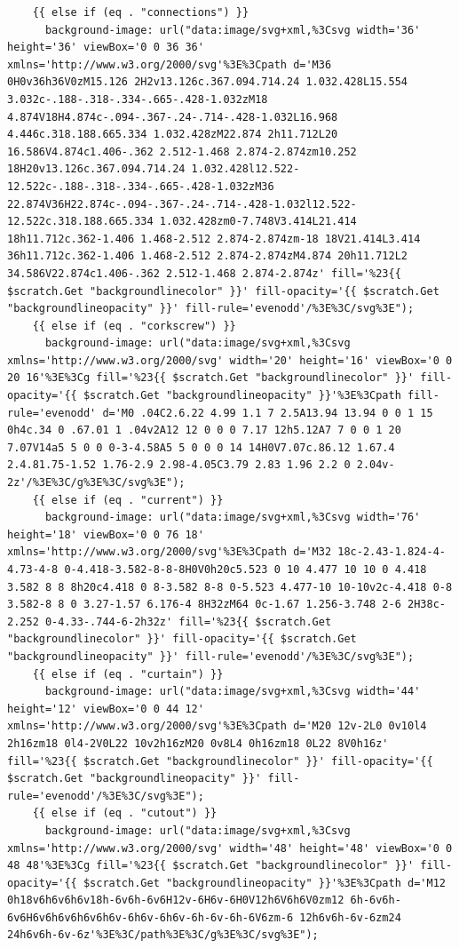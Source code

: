 \documentclass[11pt]{article}
\begin{document}
\begin{enumerate}
\begin{verbatim}
    {{ else if (eq . "connections") }}
      background-image: url("data:image/svg+xml,%3Csvg width='36' height='36' viewBox='0 0 36 36' xmlns='http://www.w3.org/2000/svg'%3E%3Cpath d='M36 0H0v36h36V0zM15.126 2H2v13.126c.367.094.714.24 1.032.428L15.554 3.032c-.188-.318-.334-.665-.428-1.032zM18 4.874V18H4.874c-.094-.367-.24-.714-.428-1.032L16.968 4.446c.318.188.665.334 1.032.428zM22.874 2h11.712L20 16.586V4.874c1.406-.362 2.512-1.468 2.874-2.874zm10.252 18H20v13.126c.367.094.714.24 1.032.428l12.522-12.522c-.188-.318-.334-.665-.428-1.032zM36 22.874V36H22.874c-.094-.367-.24-.714-.428-1.032l12.522-12.522c.318.188.665.334 1.032.428zm0-7.748V3.414L21.414 18h11.712c.362-1.406 1.468-2.512 2.874-2.874zm-18 18V21.414L3.414 36h11.712c.362-1.406 1.468-2.512 2.874-2.874zM4.874 20h11.712L2 34.586V22.874c1.406-.362 2.512-1.468 2.874-2.874z' fill='%23{{ $scratch.Get "backgroundlinecolor" }}' fill-opacity='{{ $scratch.Get "backgroundlineopacity" }}' fill-rule='evenodd'/%3E%3C/svg%3E");
    {{ else if (eq . "corkscrew") }}
      background-image: url("data:image/svg+xml,%3Csvg xmlns='http://www.w3.org/2000/svg' width='20' height='16' viewBox='0 0 20 16'%3E%3Cg fill='%23{{ $scratch.Get "backgroundlinecolor" }}' fill-opacity='{{ $scratch.Get "backgroundlineopacity" }}'%3E%3Cpath fill-rule='evenodd' d='M0 .04C2.6.22 4.99 1.1 7 2.5A13.94 13.94 0 0 1 15 0h4c.34 0 .67.01 1 .04v2A12 12 0 0 0 7.17 12h5.12A7 7 0 0 1 20 7.07V14a5 5 0 0 0-3-4.58A5 5 0 0 0 14 14H0V7.07c.86.12 1.67.4 2.4.81.75-1.52 1.76-2.9 2.98-4.05C3.79 2.83 1.96 2.2 0 2.04v-2z'/%3E%3C/g%3E%3C/svg%3E");
    {{ else if (eq . "current") }}
      background-image: url("data:image/svg+xml,%3Csvg width='76' height='18' viewBox='0 0 76 18' xmlns='http://www.w3.org/2000/svg'%3E%3Cpath d='M32 18c-2.43-1.824-4-4.73-4-8 0-4.418-3.582-8-8-8H0V0h20c5.523 0 10 4.477 10 10 0 4.418 3.582 8 8 8h20c4.418 0 8-3.582 8-8 0-5.523 4.477-10 10-10v2c-4.418 0-8 3.582-8 8 0 3.27-1.57 6.176-4 8H32zM64 0c-1.67 1.256-3.748 2-6 2H38c-2.252 0-4.33-.744-6-2h32z' fill='%23{{ $scratch.Get "backgroundlinecolor" }}' fill-opacity='{{ $scratch.Get "backgroundlineopacity" }}' fill-rule='evenodd'/%3E%3C/svg%3E");
    {{ else if (eq . "curtain") }}
      background-image: url("data:image/svg+xml,%3Csvg width='44' height='12' viewBox='0 0 44 12' xmlns='http://www.w3.org/2000/svg'%3E%3Cpath d='M20 12v-2L0 0v10l4 2h16zm18 0l4-2V0L22 10v2h16zM20 0v8L4 0h16zm18 0L22 8V0h16z' fill='%23{{ $scratch.Get "backgroundlinecolor" }}' fill-opacity='{{ $scratch.Get "backgroundlineopacity" }}' fill-rule='evenodd'/%3E%3C/svg%3E");
    {{ else if (eq . "cutout") }}
      background-image: url("data:image/svg+xml,%3Csvg xmlns='http://www.w3.org/2000/svg' width='48' height='48' viewBox='0 0 48 48'%3E%3Cg fill='%23{{ $scratch.Get "backgroundlinecolor" }}' fill-opacity='{{ $scratch.Get "backgroundlineopacity" }}'%3E%3Cpath d='M12 0h18v6h6v6h6v18h-6v6h-6v6H12v-6H6v-6H0V12h6V6h6V0zm12 6h-6v6h-6v6H6v6h6v6h6v6h6v-6h6v-6h6v-6h-6v-6h-6V6zm-6 12h6v6h-6v-6zm24 24h6v6h-6v-6z'%3E%3C/path%3E%3C/g%3E%3C/svg%3E");

\end{verbatim}
\end{enumerate}
\end{document}
